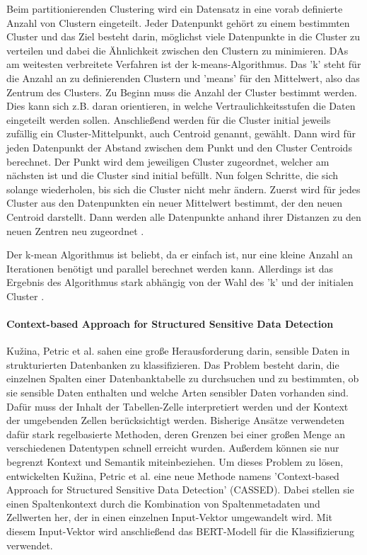 Beim partitionierenden Clustering wird ein Datensatz in eine vorab definierte Anzahl von Clustern eingeteilt. Jeder Datenpunkt gehört zu einem bestimmten Cluster und das Ziel besteht darin, möglichst viele Datenpunkte in die Cluster zu verteilen und dabei die Ähnlichkeit zwischen den Clustern zu minimieren. DAs am weitesten verbreitete Verfahren ist der k-means-Algorithmus. Das 'k' steht für die Anzahl an zu definierenden Clustern und 'means' für den Mittelwert, also das Zentrum des Clusters. Zu Beginn muss die Anzahl der Cluster bestimmt werden. Dies kann sich z.B. daran orientieren, in welche Vertraulichkeitsstufen die Daten eingeteilt werden sollen. Anschließend werden für die Cluster initial jeweils zufällig ein Cluster-Mittelpunkt, auch Centroid genannt, gewählt. Dann wird für jeden Datenpunkt der Abstand zwischen dem Punkt und den Cluster Centroids berechnet. Der Punkt wird dem jeweiligen Cluster zugeordnet, welcher am nächsten ist und die Cluster sind initial befüllt. Nun folgen Schritte, die sich solange wiederholen, bis sich die Cluster nicht mehr ändern. Zuerst wird für jedes Cluster aus den Datenpunkten ein neuer Mittelwert bestimmt, der den neuen Centroid darstellt. Dann werden alle Datenpunkte anhand ihrer Distanzen zu den neuen Zentren neu zugeordnet \cite{Suyal.2014}.

Der k-mean Algorithmus ist beliebt, da er einfach ist, nur eine kleine Anzahl an Iterationen benötigt und parallel berechnet werden kann. Allerdings ist das Ergebnis des Algorithmus stark abhängig von der Wahl des 'k' und der initialen Cluster \cite{Suyal.2014}.


\paragraph{Context-based Approach for Structured Sensitive Data Detection}
Kužina, Petric et al. \cite{Kuzina.2023} sahen eine große Herausforderung darin, sensible Daten in strukturierten Datenbanken zu klassifizieren. Das Problem besteht darin, die einzelnen Spalten einer Datenbanktabelle zu durchsuchen und zu bestimmten, ob sie sensible Daten enthalten und welche Arten sensibler Daten vorhanden sind. Dafür muss der Inhalt der Tabellen-Zelle interpretiert werden und der Kontext der umgebenden Zellen berücksichtigt werden. Bisherige Ansätze verwendeten dafür stark regelbasierte Methoden, deren Grenzen bei einer großen Menge an verschiedenen Datentypen schnell erreicht wurden. Außerdem können sie nur begrenzt Kontext und Semantik miteinbeziehen. Um dieses Problem zu lösen, entwickelten
Kužina, Petric et al. \cite{Kuzina.2023} eine neue Methode namens 'Context-based Approach for Structured Sensitive Data Detection' (CASSED). Dabei stellen sie einen Spaltenkontext durch die Kombination von Spaltenmetadaten und Zellwerten her, der in einen einzelnen Input-Vektor umgewandelt wird. Mit diesem Input-Vektor wird anschließend das BERT-Modell für die Klassifizierung verwendet.

